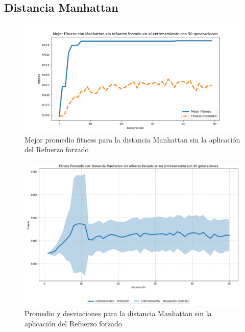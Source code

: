 \documentclass[lettersize, journal]{IEEEtran}
\begin{document}
\subsection{Distancia Manhattan}
\setcounter{figure}{0}
\renewcommand{\thefigure}{S\arabic{figure}-MN}
\begin{figure}[H]
    \centering
    \includegraphics[width=0.9 \linewidth]{Sin_Refuerzo_50Gen/Manh_NoRef_50Gen.png}
    \caption{Mejor promedio fitness para la distancia Manhattan sin la aplicación del Refuerzo forzado}
    \label{fig:manh_no_ref_50}
\end{figure}
\begin{figure}[H]
    \centering
    \includegraphics[width=0.9 \linewidth]{Sin_Refuerzo_50Gen/Manh_NoRef_50Gen_Sombra.png}
    \caption{Promedio y desviaciones para la distancia Manhattan sin la aplicación del Refuerzo forzado}
    \label{fig:manh_no_ref_50_sombra}
\end{figure}
\end{document}
